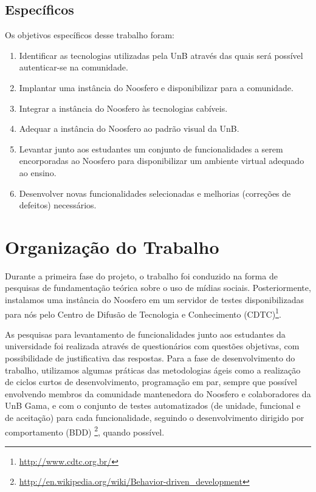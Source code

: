  
 
\subsection{Específicos}
 
Os objetivos específicos desse trabalho foram:
 
\begin{enumerate}
    
\item Identificar as tecnologias utilizadas pela UnB através das quais será
possível autenticar-se na comunidade.
\item Implantar uma instância do Noosfero e disponibilizar para a comunidade.
\item Integrar a instância do Noosfero às tecnologias cabíveis.
\item Adequar a instância do Noosfero ao padrão visual da UnB.
\item Levantar junto aos estudantes um conjunto de funcionalidades a serem
encorporadas ao Noosfero para disponibilizar um ambiente virtual adequado ao
ensino.
\item Desenvolver novas funcionalidades selecionadas e melhorias (correções de defeitos) necessários.
 
\end{enumerate}
 
 
\section{Organização do Trabalho}
 
Durante a primeira fase do projeto, o trabalho foi conduzido na forma de
pesquisas de fundamentação teórica sobre o uso de mídias sociais.
Posteriormente, instalamos uma instância do Noosfero em um
servidor de testes disponibilizadas para nós pelo Centro de Difusão de
Tecnologia e Conhecimento (CDTC)\footnote{\url{http://www.cdtc.org.br/}}. 
 
As pesquisas para levantamento de funcionalidades junto aos estudantes
da universidade foi realizada através de questionários com questões objetivas,
com possibilidade de justificativa das respostas.
%
Para a fase de desenvolvimento do trabalho, utilizamos algumas práticas das
metodologias ágeis como a realização de ciclos curtos de desenvolvimento,
programação em par, sempre que possível envolvendo membros da comunidade
mantenedora do Noosfero e colaboradores da UnB Gama, e com o conjunto de
testes automatizados (de unidade, funcional e de aceitação) para cada funcionalidade,
seguindo o desenvolvimento dirigido por comportamento (BDD)%
\footnote{\url{http://en.wikipedia.org/wiki/Behavior-driven_development}},
quando possível.
 
